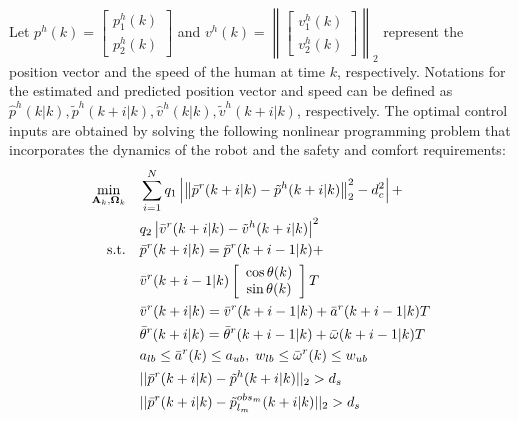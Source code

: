 \documentclass[journal]{IEEEtran}
\begin{document}
	Let $p^h(k)=
	\left[ 
	\begin{array}{c}
	p^h_1(k)\\
	p^h_2(k)
	\end{array}\right] $ and $v^h(k)=
	\left\|\left[ 
	\begin{array}{c}
	v^h_1(k)\\
	v^h_2(k)
	\end{array}\right]\right\|_2
	$ represent the position vector and the speed of the human at time $k$, respectively.
	Notations for the estimated and predicted position vector and speed can be defined as $\hat{p}^h(k|k),\tilde{p}^h(k+i|k),\hat{v}^h(k|k),\tilde{v}^h(k+i|k)$, respectively.
	The optimal control inputs are obtained by solving the following nonlinear programming problem that incorporates the dynamics of the robot and the safety and comfort requirements:
	\begin{subequations}\label{eqn:path_plan_mpc}
		\begin{align}
		\min_{\mathbf{A}_k,\mathbf{\Omega}_k} \quad &\sum\limits_{i=1}^{N} q_1\left| \left\|\bar{p}^r(k+i|k)-\tilde{p}^h(k+i|k)\right\|^2_2-d^2_{c}\right| + \notag\\
		& q_2\left|\bar{v}^r(k+i|k)-\tilde{v}^h(k+i|k)\right|^2\label{eqn:obj}\\
		\text{s.t.} \quad & \bar{p}^r(k+i|k)=\bar{p}^r(k+i-1|k)+\notag\\
		&\bar{v}^r(k+i-1|k)
		\left[ 
		\begin{array}{c}
		\cos \theta(k)\\
		\sin \theta(k)\\
		\end{array}
		\right]T\label{eqn:constr:dyn_pre_motion}\\
		& \bar{v}^r(k+i|k)=\bar{v}^r(k+i-1|k)+\bar{a}^r(k+i-1|k)T\label{eqn:constr:dyn_pre_v}\\       &\bar{\theta}^r(k+i|k)=\bar{\theta}^r(k+i-1|k)+\bar{\omega}(k+i-1|k)T\label{eqn:constr:dyn_pre_theta}\\
		& a_{lb}\le \bar{a}^r(k)\le a_{ub},\;w_{lb}\le \bar{\omega}^r(k)\le w_{ub}\label{eqn:constr:aw}\\
		& ||\bar{p}^r(k+i|k)-\tilde{p}^h(k+i|k)||_2> d_s\label{eqn:constr:safety_human}\\
		& ||\bar{p}^r(k+i|k)-\tilde{p}^{obs_m}_{l_m}(k+i|k)||_2> d_s\label{eqn:constr:safety_mv_obs}\\

\end{align}
\end{subequations}
\end{document}
